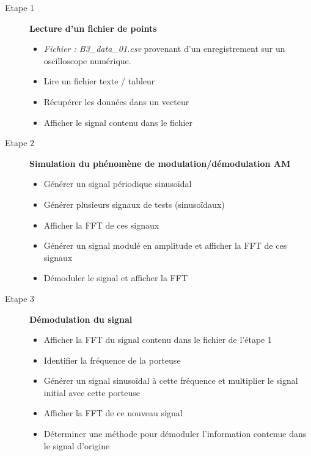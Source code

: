 \documentclass[10pt]{article} %
\begin{document}
\begin{description}
	\item[Etape 1] \textbf{Lecture d'un fichier de points}
	
	\begin{itemize}
		\item \textit{Fichier : B3\_data\_01.csv} provenant d'un enregistrement sur un oscilloscope numérique.
		\item Lire un fichier texte / tableur
		\item Récupérer les données dans un vecteur
		\item Afficher le signal contenu dans le fichier
	\end{itemize}
	
\qquad

	\item[Etape 2] \textbf{Simulation du phénomène de modulation/démodulation AM}
	\begin{itemize}
		\item Générer un signal périodique sinusoïdal
		\item Générer plusieurs signaux de tests (sinusoïdaux)
		\item Afficher la FFT de ces signaux
		\item Générer un signal modulé en amplitude et afficher la FFT de ces signaux
		\item Démoduler le signal et afficher la FFT
	\end{itemize}
	
\qquad
	
	\item[Etape 3] \textbf{Démodulation du signal}
	\begin{itemize}
		\item Afficher la FFT du signal contenu dans le fichier de l'étape 1
		\item Identifier la fréquence de la porteuse
		\item Générer un signal sinusoïdal à cette fréquence et multiplier le signal initial avec cette porteuse
		\item Afficher la FFT de ce nouveau signal 
		\item Déterminer une méthode pour démoduler l'information contenue dans le signal d'origine	
	\end{itemize}

\qquad


\end{description}
\end{document}
